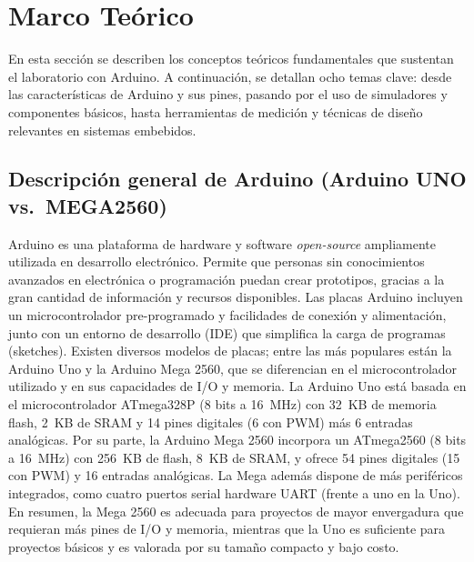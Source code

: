 \documentclass{article}
\begin{document}
\section{Marco Teórico}
En esta sección se describen los conceptos teóricos fundamentales que sustentan el laboratorio con Arduino. A continuación, se detallan ocho temas clave: desde las características de Arduino y sus pines, pasando por el uso de simuladores y componentes básicos, hasta herramientas de medición y técnicas de diseño relevantes en sistemas embebidos.

\subsection{Descripción general de Arduino (Arduino UNO vs.\ MEGA2560)}
Arduino es una plataforma de hardware y software \textit{open-source} ampliamente utilizada en desarrollo electrónico. Permite que personas sin conocimientos avanzados en electrónica o programación puedan crear prototipos, gracias a la gran cantidad de información y recursos disponibles.\cite{Gonzalez2018} Las placas Arduino incluyen un microcontrolador pre-programado y facilidades de conexión y alimentación, junto con un entorno de desarrollo (IDE) que simplifica la carga de programas (sketches). Existen diversos modelos de placas; entre las más populares están la Arduino Uno y la Arduino Mega 2560, que se diferencian en el microcontrolador utilizado y en sus capacidades de I/O y memoria. La Arduino Uno está basada en el microcontrolador ATmega328P (8 bits a 16~MHz) con 32~KB de memoria flash, 2~KB de SRAM y 14 pines digitales (6 con PWM) más 6 entradas analógicas.\cite{ArduinoUno} Por su parte, la Arduino Mega 2560 incorpora un ATmega2560 (8 bits a 16~MHz) con 256~KB de flash, 8~KB de SRAM, y ofrece 54 pines digitales (15 con PWM) y 16 entradas analógicas.\cite{ArduinoMega} La Mega además dispone de más periféricos integrados, como cuatro puertos serial hardware UART (frente a uno en la Uno). En resumen, la Mega 2560 es adecuada para proyectos de mayor envergadura que requieran más pines de I/O y memoria, mientras que la Uno es suficiente para proyectos básicos y es valorada por su tamaño compacto y bajo costo.
\end{document}

